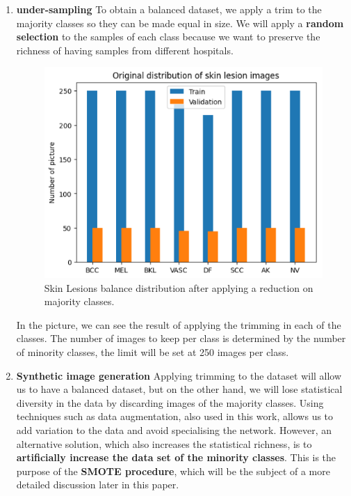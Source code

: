 \begin{enumerate}
    \item \textbf{under-sampling}
        To obtain a balanced dataset, we apply a trim to the majority classes so they can be made equal in size.  We will apply a \textbf{random selection} to the samples of each class because we want to preserve the richness of having samples from different hospitals.

        \begin{figure}[ht]
            \begin{center}
                \includegraphics[scale=0.5]{images/Building/Skin lesion Balance distribution.png}
                \caption{Skin Lesions balance distribution after applying a reduction on majority classes.}
            \label{fig: Skin Lesions balance distribution}    
            \end{center}
        \end{figure}
        
    In the picture, we can see the result of applying the trimming in each of the classes. The number of images to keep per class is determined by the number of minority classes, the limit will be set at 250 images per class.
        

    \item \textbf{Synthetic image generation} 
        \label{pr: synthetic_image_generation}
        Applying trimming to the dataset will allow us to have a balanced dataset, but on the other hand, we will lose statistical diversity in the data by discarding images of the majority classes. Using techniques such as data augmentation, also used in this work, allows us to add variation to the data and avoid specialising the network. However, an alternative solution, which also increases the statistical richness, is to \textbf{artificially increase the data set of the minority classes}. This is the purpose of the \textbf{SMOTE procedure}, which will be the subject of a more detailed discussion later in this paper.
    
\end{enumerate}

